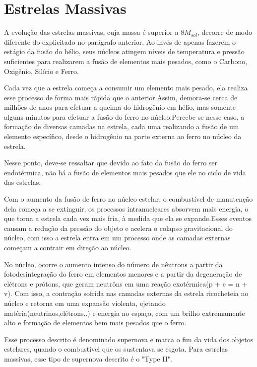 \documentclass[article,12pt,oneside,a4paper,english,brazil,sumario=tradicional]{abntex2}
\begin{document}
\section{Estrelas Massivas}
A evolução das estrelas massivas, cuja massa é superior a $8M_{sol}$, decorre de modo diferente do explicitado no parágrafo anterior. Ao invés de apenas fazerem o estágio da fusão do hélio, seus núcleos atingem níveis de temperatura e pressão suficientes para realizarem a fusão de elementos mais pesados, como o Carbono, Oxigênio, Silício e Ferro.

Cada vez que a estrela começa a consumir um elemento mais pesado, ela realiza esse processo de forma mais rápida que o anterior.Assim, demora-se cerca de milhões de anos para efetuar a queima do hidrogênio em hélio, mas somente alguns minutos para efetuar a fusão do ferro no núcleo.Percebe-se nesse caso, a formação de diversas camadas na estrela, cada uma realizando a fusão de um elemento específico, desde o hidrogênio na parte externa ao ferro no núcleo da estrela.

Nesse ponto, deve-se ressaltar que devido ao fato da fusão do ferro ser endotérmica, não há a fusão de elementos mais pesados que ele no ciclo de vida das estrelas.

Com o aumento da fusão de ferro no núcleo estelar, o combustível de manutenção dela começa a se extinguir, os processos intranucleares absorvem mais energia, o que torna a estrela cada vez mais fria, à medida que ela se expande.Esses eventos causam a redução da pressão do objeto e acelera o colapso gravitacional do núcleo, com isso a estrela entra em um processo onde as camadas externas começam a contrair em direção ao núcleo.

No núcleo, ocorre o aumento intenso do número de nêutrons a partir da fotodesintegração do ferro em elementos menores e a partir da degeneração de elétrons e prótons, que geram neutrôns em uma reação exotérmica(p + e = n + v). Com isso, a contração sofrida nas camadas externas da estrela ricocheteia no núcleo e retorna em uma expansão violenta, ejetando matéria(neutrinos,elétrons..) e energia no espaço, com um brilho extremamente alto e formação de elementos bem mais pesados que o ferro.

Esse processo descrito é denominado supernova e marca o fim da vida dos objetos estelares, quando o combustível que os sustentava se esgota. Para estrelas massivas, esse tipo de supernova descrito é o "Type II".
\end{document}
